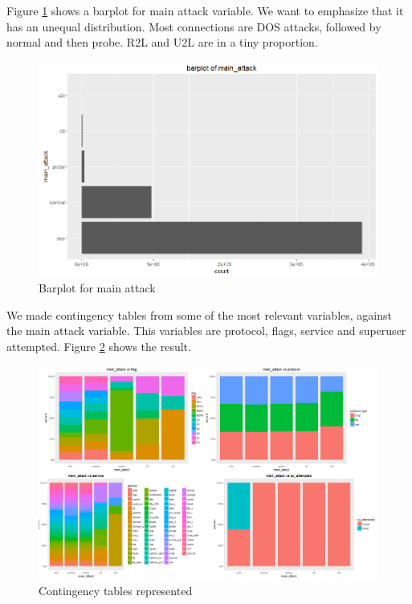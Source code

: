 \documentclass[a4paper]{article} %
\begin{document}
Figure \ref{fig:barplots} shows a barplot for main attack variable. We want to emphasize that it has an unequal distribution. Most connections are DOS attacks, followed by normal and then probe. R2L and U2L are in a tiny proportion.

\begin{figure}[H]
	\centering
	\includegraphics[scale=0.5]{bar_main_attack.png}
	\caption{Barplot for main attack}
	\label{fig:barplots}
\end{figure}
We made contingency tables from some of the most relevant variables, against the main attack variable. This variables are protocol, flags, service and superuser attempted. Figure \ref{fig:cont} shows the result. 

\begin{figure}[H]
	\centering
	\includegraphics[scale=0.85]{cont.png}
	\caption{Contingency tables represented }
	\label{fig:cont}
\end{figure}
\end{document}
